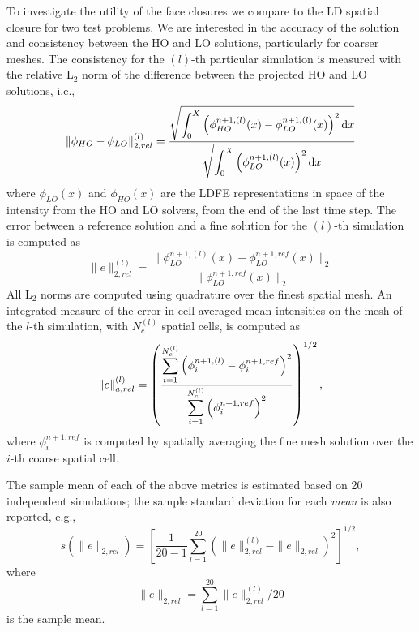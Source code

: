 To investigate the utility of the face closures we compare to the LD spatial
closure for two test problems.  We are interested in the accuracy of the solution and
consistency between the HO and LO solutions, particularly for coarser meshes. 
The consistency for the $(l)$-th particular simulation is measured with the relative L$_2$ norm
of the difference between the projected HO and LO solutions, i.e.,
\begin{equation}
    \|\phi_{HO} - \phi_{LO}\|^{(l)}_{2,rel} = \frac{\displaystyle \sqrt{\int_0^X \left(
        \phi_{HO}^{n+1,(l)}(x) - \phi_{LO}^{n+1,(l)}(x) \right)^2 \mathrm{d} x}}{\displaystyle \sqrt{
            \int_0^X \left(\phi_{LO}^{n+1,(l)}(x)\right)^2 \mathrm{d} x }}
\end{equation}
where $\phi_{LO}(x)$ and $\phi_{HO}(x)$ are the LDFE representations in space of the
intensity from the HO and LO solvers, from the end of the last time step.
The error between a reference solution and a fine solution for the ${(l)}$-th simulation
is computed as
\begin{equation}
    \|e\|^{{(l)}}_{2,rel} = \frac{\|\phi_{LO}^{n+1,{(l)}}(x) -
    \phi_{LO}^{n+1,ref}\left( x \right)\|_2}{\|\phi_{LO}^{n+1,ref}\left( x \right)\|_2}
\end{equation}
All L$_2$ norms are computed using quadrature over the finest spatial mesh.  An
integrated measure of the error in cell-averaged mean intensities on the mesh of the
$l$-th simulation, with $N_c^{(l)}$ spatial cells, is computed as
\begin{equation}
    \|e\|^{{(l)}}_{a,rel} = \left({\frac{\displaystyle \sum\limits_{i=1}^{N^{(l)}_c}
    \left(\phi_i^{n+1,{(l)}} - \phi_i^{n+1,ref}
\right)^2}{\displaystyle \sum\limits_{i=1}^{N^{(l)}_c}\left(\phi_i^{n+1,ref}\right)^2}}\right)^{1/2},
\end{equation}
where $\phi_i^{n+1,ref}$ is computed by spatially averaging the fine mesh solution over
the $i$-th coarse spatial cell.

The sample mean of each of the above metrics is estimated based on 20 independent
simulations; the sample standard deviation for each \emph{mean} is also reported, e.g.,
\begin{equation}
    s\left(\|e\|_{2,rel}\right) = \left[\frac{1}{20-1}\sum_{l=1}^{20} \left(
    \|e\|_{2,rel}^{(l)} - \|e\|_{2,rel} \right)^2\right]^{1/2},
\end{equation}
where
\begin{equation}\label{eq:avg_err}
\|e\|_{2,rel}=\sum_{l=1}^{20}\|e\|_{2,rel}^{(l)}/20
\end{equation}
is the sample mean.

